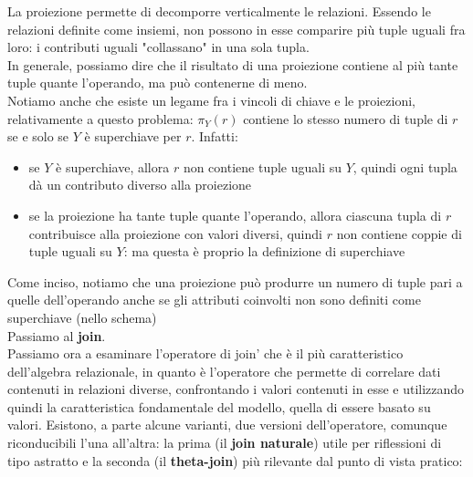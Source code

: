 \documentclass[a4paper,12pt, oneside]{book}
\begin{document}
La proiezione permette di decomporre verticalmente le relazioni. Essendo le relazioni definite come insiemi, non possono in esse comparire più tuple uguali
fra loro: i contributi uguali "collassano" in una sola tupla.\\
In generale, possiamo dire che il risultato di una proiezione contiene al più
tante tuple quante l'operando, ma può contenerne di meno.\\
Notiamo anche che esiste un legame fra i vincoli di chiave e le proiezioni, relativamente a questo problema: $\pi_Y(r)$ contiene lo stesso numero di tuple
di $r$ se e solo se $Y$ è superchiave per $r$. Infatti:
\begin{itemize}
\item se $Y$ è superchiave, allora $r$ non contiene tuple uguali su $Y$, quindi ogni tupla dà un contributo diverso alla proiezione
\item se la proiezione ha tante tuple quante l'operando, allora ciascuna tupla di $r$
  contribuisce alla proiezione con valori diversi, quindi $r$ non contiene coppie di
tuple uguali su $Y$: ma questa è proprio la definizione di superchiave
\end{itemize}
Come inciso, notiamo che una proiezione può produrre un numero di
tuple pari a quelle dell'operando anche se gli attributi coinvolti non sono definiti come superchiave (nello schema)\\
Passiamo al \textbf{join}.\\
Passiamo ora a esaminare l'operatore di join' che è il più caratteristico dell'algebra relazionale,
in quanto è l'operatore che permette di correlare dati contenuti in
relazioni diverse, confrontando i valori contenuti in esse e utilizzando quindi la
caratteristica fondamentale del modello, quella di essere basato su valori. Esistono, a parte alcune varianti, due versioni dell'operatore, comunque riconducibili
l'una all'altra: la prima (il \textbf{join naturale}) utile per riflessioni di tipo astratto e la
seconda (il \textbf{theta-join}) più rilevante dal punto di vista pratico:
\end{document}
